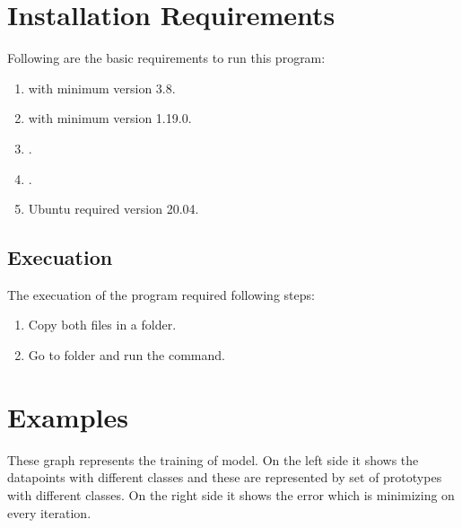 \documentclass[letterpaper,10pt,english,openany,oneside]{sphinxmanual}
\begin{document}
\chapter{Installation Requirements}
\label{\detokenize{index:installation-requirements}}
Following are the basic requirements to run this program:
\begin{enumerate}
\def\theenumi{\arabic{enumi}}
\def\labelenumi{\theenumi .}
\makeatletter\def\p@enumii{\p@enumi \theenumi .}\makeatother
\item {} 
 with minimum version 3.8.

\item {} 
 with minimum version 1.19.0.

\item {} 
.

\item {} 
 .

\item {} 
Ubuntu required version 20.04.

\end{enumerate}


\section{Execuation}
\label{\detokenize{index:execuation}}
The execuation of the program required following steps:
\begin{enumerate}
\def\theenumi{\arabic{enumi}}
\def\labelenumi{\theenumi .}
\makeatletter\def\p@enumii{\p@enumi \theenumi .}\makeatother
\item {} 
Copy both files in a folder.

\item {} 
Go to folder and run the  command.

\end{enumerate}


\chapter{Examples}
\label{\detokenize{index:examples}}
These graph represents the training of model. On the left side it shows the datapoints with different classes and these are represented by set of prototypes with different classes. On the right side it shows the error which is minimizing on every iteration.
\end{document}
